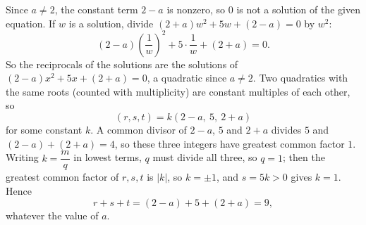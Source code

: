 Since $a\ne2$, the constant term $2-a$ is nonzero, so $0$ is not a solution of the given equation. If $w$ is a solution, divide $(2+a)w^2+5w+(2-a)=0$ by $w^2$:
\[(2-a)\left(\dfrac{1}{w}\right)^2+5\cdot\dfrac{1}{w}+(2+a)=0 .\]
So the reciprocals of the solutions are the solutions of $(2-a)x^2+5x+(2+a)=0$, a quadratic since $a\ne2$. Two quadratics with the same roots (counted with multiplicity) are constant multiples of each other, so
\[(r,s,t)=k\left(2-a,\ 5,\ 2+a\right)\]
for some constant $k$. A common divisor of $2-a$, $5$ and $2+a$ divides $5$ and $(2-a)+(2+a)=4$, so these three integers have greatest common factor $1$. Writing $k=\dfrac{m}{q}$ in lowest terms, $q$ must divide all three, so $q=1$; then the greatest common factor of $r,s,t$ is $|k|$, so $k=\pm1$, and $s=5k>0$ gives $k=1$. Hence
\[r+s+t=(2-a)+5+(2+a)=\boxed{9},\]
whatever the value of $a$.
